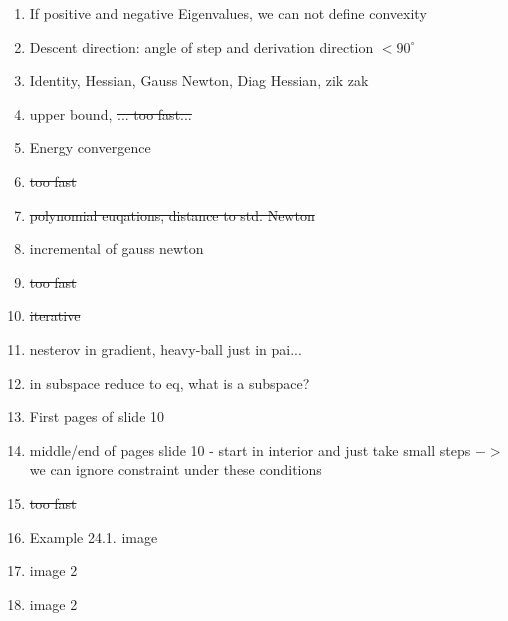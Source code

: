 \documentclass{report}
\begin{document}
\begin{enumerate}
\item If positive and negative Eigenvalues, we can not define convexity
\item Descent direction: angle of step and derivation direction $< 90^\circ$
\item Identity, Hessian, Gauss Newton, Diag Hessian, zik zak
\item upper bound, \sout{... too fast...}
\item Energy convergence 
\item \sout{too fast}
\item \sout{polynomial euqations, distance to std. Newton}
\item incremental of gauss newton
\item \sout{too fast}
\item \sout{iterative}
\item nesterov in gradient, heavy-ball just in pai...
\item in subspace reduce to eq, what is a subspace?
\item First pages of slide 10
\item middle/end of pages slide 10 - start in interior and just take small steps $->$ we can ignore constraint under these conditions
\item \sout{too fast}
\item Example 24.1. image
\item image 2
\item image 2


\end{enumerate}
\end{document}
